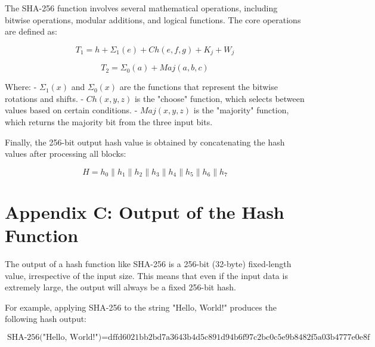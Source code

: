 The SHA-256 function involves several mathematical operations, including bitwise operations, modular additions, and logical functions. The core operations are defined as:

\[
T_1 = h + \Sigma_1(e) + Ch(e,f,g) + K_j + W_j
\]

\[
T_2 = \Sigma_0(a) + Maj(a,b,c)
\]

Where:
- \( \Sigma_1(x) \) and \( \Sigma_0(x) \) are the functions that represent the bitwise rotations and shifts.
- \( Ch(x, y, z) \) is the "choose" function, which selects between values based on certain conditions.
- \( Maj(x, y, z) \) is the "majority" function, which returns the majority bit from the three input bits.

Finally, the 256-bit output hash value is obtained by concatenating the hash values after processing all blocks:

\[
H = h_0 \parallel h_1 \parallel h_2 \parallel h_3 \parallel h_4 \parallel h_5 \parallel h_6 \parallel h_7
\]

\clearpage
\section*{\centering Appendix C: Output of the Hash Function}

The output of a hash function like SHA-256 is a 256-bit (32-byte) fixed-length value, irrespective of the input size. This means that even if the input data is extremely large, the output will always be a fixed 256-bit hash.

For example, applying SHA-256 to the string "Hello, World!" produces the following hash output:

\[
\text{SHA-256("Hello, World!")} = \text{dffd6021bb2bd7a3643b4d5c891d94b6f97c2bc0c5e9b8482f5a03b4777e0e8f}
\]
